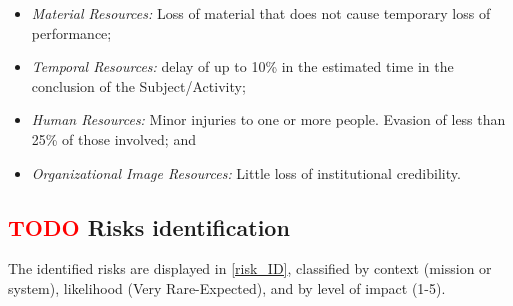 \begin{itemize}
\begin{itemize}
         \item  \textit{Material Resources:} Loss of material that does not cause temporary loss of performance;
         \item  \textit{Temporal Resources:} delay of up to 10\% in the estimated time in the conclusion of the Subject/Activity;
         \item  \textit{Human Resources:} Minor injuries to one or more people. Evasion of less than 25\% of those involved; and
         \item  \textit{Organizational Image Resources:} Little loss of institutional credibility.
    \end{itemize}
\end{itemize}

\subsection{ \textcolor{red}{TODO} Risks identification}

The identified risks are displayed in \autoref{risk_ID}, classified by context (mission or system), likelihood (Very Rare-Expected), and by level of impact (1-5).

